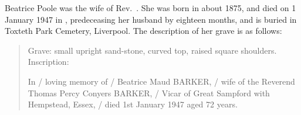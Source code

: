 
Beatrice Poole was the wife of Rev.\ .
She was born in about 1875, and died on 1 January 1947 in , predeceasing her husband by eighteen months, and is buried in Toxteth Park Cemetery, Liverpool.
The description of her grave is as follows:\cite{ToxtethParkCemeteryInscriptions}

\begin{quotation}
Grave: small upright sand-stone, curved top, raised square shoulders. Inscription:

In / loving memory of / Beatrice Maud BARKER, / wife of the Reverend Thomas Percy Conyers BARKER, / Vicar of Great Sampford with Hempstead, Essex, / died 1st January 1947 aged 72 years.
\end{quotation}

% 
% 
% 
% 
% 
% 
% 
%  	 	 	 	 	 	 	 	 	 	 	 
% 
% 
